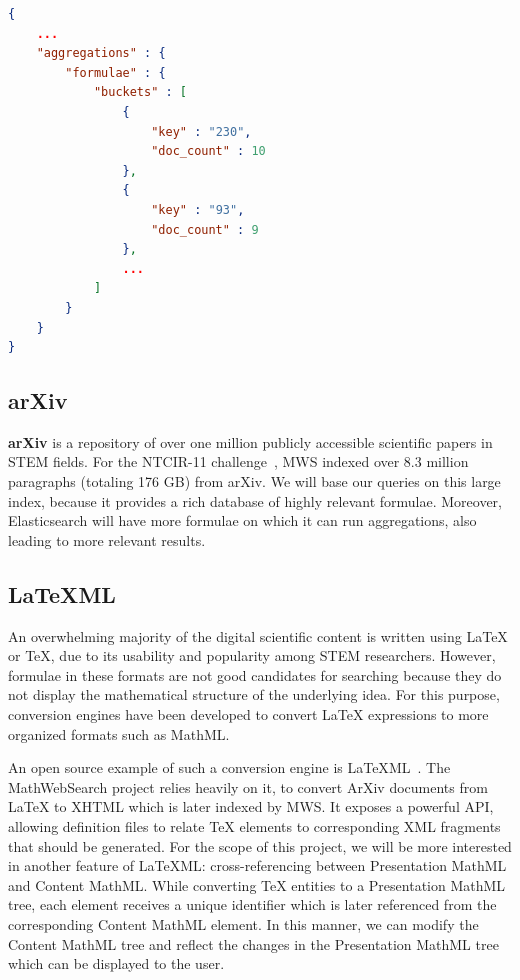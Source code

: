 \documentclass[a4paper,oneside]{article}
\def\MWS{\textsf{MWS}\xspace}
\def\mws{\textsf{MathWebSearch}\xspace}
\def\cmml{\textsf{Content MathML}\xspace}
\def\pmml{\textsf{Presentation MathML}\xspace}
\def\arxiv{\textsf{ArXiv}\xspace}
\def\latexml{\LaTeX{ML}\xspace}
\def\mathml{\textsf{MathML}\xspace}
\def\latex{\LaTeX\xspace}
\def\tex{\TeX\xspace}
\begin{document}
\begin{lstlisting}[float,
    language=json,firstnumber=1,caption=Elastic Search Term
Aggregation Response, captionpos=b, label=lst:es_agg_resp]
{
    ...
    "aggregations" : {
        "formulae" : {
            "buckets" : [
                {
                    "key" : "230",
                    "doc_count" : 10
                },
                {
                    "key" : "93",
                    "doc_count" : 9
                },
                ...
            ]
        }
    }
}
\end{lstlisting}
\FloatBarrier

\subsection{arXiv}\label{subsec:arxiv}
\textbf{arXiv} is a repository of over one million publicly accessible
scientific papers in STEM fields. For the NTCIR-11
challenge~\cite{HamKohPro:man14},
MWS indexed over 8.3 million paragraphs (totaling 176 GB) from arXiv. We will
base our queries on this large index, because it provides a rich database of
highly relevant formulae. Moreover, Elasticsearch will have more formulae on
which it can run aggregations, also leading to more relevant results.

\subsection{\latexml}\label{subsec:latexml}
An overwhelming majority of the digital scientific content is written using
\latex or \tex, due to its usability and popularity among STEM researchers.
However, formulae in these formats are not good candidates for searching
because they do not display the mathematical structure of the underlying
idea. For this purpose, conversion engines have been developed to convert
\latex expressions to more organized formats such as \mathml.

An open source example of such a conversion engine is
\latexml~\cite{Miller:latexml:online}. The \mws project relies heavily on it,
to convert \arxiv documents from \latex to XHTML which is later indexed by \MWS.
It exposes a powerful API, allowing definition files to relate \tex elements to
corresponding XML fragments that should be generated.
For the scope of this project, we will be more interested in another feature of
\latexml: cross-referencing between \pmml and \cmml. While converting \tex
entities to a \pmml tree, each element receives a unique identifier which is
later referenced from the corresponding \cmml element. In this manner, we can
modify the \cmml tree and reflect the changes in the \pmml tree which can be
displayed to the user.
\end{document}
